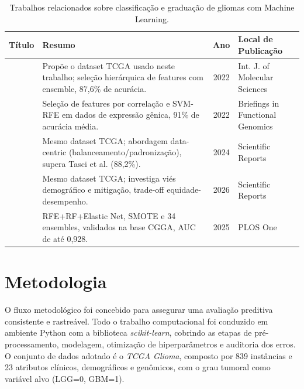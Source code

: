 \documentclass[12pt]{article}
\begin{document}
\begin{table}[!htb]
\centering
\caption{Trabalhos relacionados sobre classificação e graduação de gliomas com Machine Learning.}
\label{tab:trabalhos_relacionados}
\footnotesize
\begin{tabular}{|p{4.4cm}|p{6cm}|c|p{2.2cm}|}
\hline
\textbf{Título} & \textbf{Resumo} & \textbf{Ano} & \textbf{Local de Publicação} \\
\hline

\cite{tasci2022} &
Propõe o dataset TCGA usado neste trabalho; seleção hierárquica de features com ensemble, 87,6\% de acurácia. &
2022 &
Int. J. of Molecular Sciences \\
\hline

\cite{munquad2022} &
Seleção de features por correlação e SVM-RFE em dados de expressão gênica, 91\% de acurácia média. &
2022 &
Briefings in Functional Genomics \\
\hline

\cite{sanchezmarques2024} &
Mesmo dataset TCGA; abordagem data-centric (balanceamento/padronização), supera Tasci et al. (88,2\%). &
2024 &
Scientific Reports \\
\hline

\cite{sanchezmarques2026} &
Mesmo dataset TCGA; investiga viés demográfico e mitigação, trade-off equidade-desempenho. &
2026 &
Scientific Reports \\
\hline

\cite{liu2025} &
RFE+RF+Elastic Net, SMOTE e 34 ensembles, validados na base CGGA, AUC de até 0,928. &
2025 &
PLOS One \\
\hline

\end{tabular}
\end{table}

\section{Metodologia}
\label{sec:metodologia}

O fluxo metodológico foi concebido para assegurar uma avaliação preditiva consistente e rastreável. Todo o trabalho computacional foi conduzido em ambiente Python com a biblioteca \textit{scikit-learn}, cobrindo as etapas de pré-processamento, modelagem, otimização de hiperparâmetros e auditoria dos erros. O conjunto de dados adotado é o \textit{TCGA Glioma}, composto por 839 instâncias e 23 atributos clínicos, demográficos e genômicos, com o grau tumoral como variável alvo (LGG=0, GBM=1).
\end{document}
